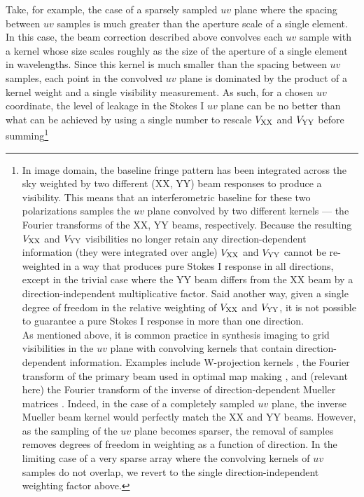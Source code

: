 \documentclass[twocolumn,apj,numberedappendix]{emulateapj}
\begin{document}
Take, for example, the case of a sparsely sampled $uv$ plane where the spacing between $uv$ samples is much greater than
the aperture scale of a single element.  In this case, the beam correction described above 
convolves each $uv$ sample with a kernel whose size scales roughly as the size of the aperture of a
single element in wavelengths.  Since this kernel is much smaller than the spacing between $uv$ samples, 
each point in the convolved $uv$ plane is dominated by the product of a kernel weight and a single visibility measurement.
As such, for a chosen $uv$ coordinate, the level of leakage in the Stokes I $uv$ plane can
be no better than what can be achieved by using a single number to rescale ${V_{\rm XX}}$ and ${V_{\rm YY}}$ before 
summing\footnote{
In image domain, the baseline fringe pattern has been
integrated across the sky weighted by two different (XX, YY) beam responses to produce
a visibility.  This means
that an interferometric baseline for these two polarizations samples the $uv$
plane convolved by two different kernels --- the Fourier transforms of the XX,
YY beams, respectively.  Because the resulting ${V_{\rm XX}}$ and ${V_{\rm YY}}$ visibilities no
longer retain any direction-dependent information (they were integrated over
angle) ${V_{\rm XX}}$ and ${V_{\rm YY}}$ cannot be re-weighted in a way that produces pure Stokes I
response in all directions, except in the trivial case where the YY beam differs
from the XX beam by a direction-independent multiplicative factor.  Said
another way, given a single degree of freedom in the relative weighting of ${V_{\rm XX}}$
and ${V_{\rm YY}}$, it is not possible to guarantee a pure Stokes I response in more than
one direction.
\\
As mentioned above, it is common practice in synthesis imaging 
to grid visibilities in the $uv$ plane
with convolving kernels that contain direction-dependent information.  Examples
include W-projection kernels \citep{cornwell_et_al2003}, the Fourier transform of the primary beam used in
optimal map making \citep{morales_matejek2009,bhatnagar_et_al2008}, and (relevant here) the 
Fourier transform of the inverse of
direction-dependent Mueller matrices \citep{tasse_et_al2013}.  Indeed, in the case of a completely
sampled $uv$ plane, the inverse Mueller beam kernel would perfectly match the XX
and YY beams.  However, as the sampling of the $uv$ plane becomes sparser, the
removal of samples removes degrees of freedom in weighting as a function of
direction.  In the limiting case of a very sparse array where the convolving
kernels of $uv$ samples do not overlap, we revert to the single
direction-independent weighting factor above.
}
\end{document}
